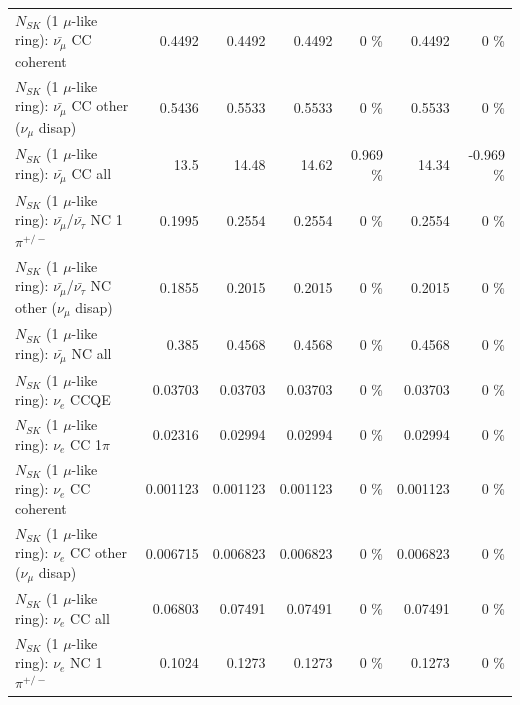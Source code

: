 \begin{table}
\begin{tabular}{| l | r | r | r  r | r  r |}
                       $N_{SK}$ (1 $\mu$-like ring): $\bar{\nu_\mu}$ CC coherent &          0.4492 &          0.4492 &          0.4492 &        0 \%  &          0.4492 &        0 \%  \\ 
        $N_{SK}$ (1 $\mu$-like ring): $\bar{\nu_\mu}$ CC other ($\nu_\mu$ disap) &          0.5436 &          0.5533 &          0.5533 &        0 \%  &          0.5533 &        0 \%  \\ 
                          $N_{SK}$ (1 $\mu$-like ring): $\bar{\nu_{\mu}}$ CC all &            13.5 &           14.48 &           14.62 &    0.969 \%  &           14.34 &   -0.969 \%  \\ 
\hline
  $N_{SK}$ (1 $\mu$-like ring): $\bar{\nu_\mu}$/$\bar{\nu_\tau}$ NC 1$\pi^{+/-}$ &          0.1995 &          0.2554 &          0.2554 &        0 \%  &          0.2554 &        0 \%  \\ 
$N_{SK}$ (1 $\mu$-like ring): $\bar{\nu_\mu}$/$\bar{\nu_\tau}$ NC other ($\nu_\mu$ disap) &          0.1855 &          0.2015 &          0.2015 &        0 \%  &          0.2015 &        0 \%  \\ 
                          $N_{SK}$ (1 $\mu$-like ring): $\bar{\nu_{\mu}}$ NC all &           0.385 &          0.4568 &          0.4568 &        0 \%  &          0.4568 &        0 \%  \\ 
\hline
\hline
\hline
                                      $N_{SK}$ (1 $\mu$-like ring): $\nu_e$ CCQE &         0.03703 &         0.03703 &         0.03703 &        0 \%  &         0.03703 &        0 \%  \\ 
                                 $N_{SK}$ (1 $\mu$-like ring): $\nu_e$ CC 1$\pi$ &         0.02316 &         0.02994 &         0.02994 &        0 \%  &         0.02994 &        0 \%  \\ 
                               $N_{SK}$ (1 $\mu$-like ring): $\nu_e$ CC coherent &        0.001123 &        0.001123 &        0.001123 &        0 \%  &        0.001123 &        0 \%  \\ 
                $N_{SK}$ (1 $\mu$-like ring): $\nu_e$ CC other ($\nu_\mu$ disap) &        0.006715 &        0.006823 &        0.006823 &        0 \%  &        0.006823 &        0 \%  \\ 
                                  $N_{SK}$ (1 $\mu$-like ring): $\nu_{e}$ CC all &         0.06803 &         0.07491 &         0.07491 &        0 \%  &         0.07491 &        0 \%  \\ 
\hline
                           $N_{SK}$ (1 $\mu$-like ring): $\nu_e$ NC 1$\pi^{+/-}$ &          0.1024 &          0.1273 &          0.1273 &        0 \%  &          0.1273 &        0 \%  \\ 

\end{tabular}
\end{table}

